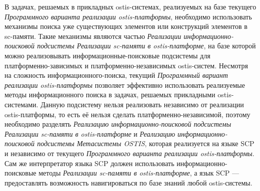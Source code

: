 \bigskip

В задачах, решаемых в прикладных ostis-системах, реализуемых на базе текущего \textit{Программного варианта реализации ostis-платформы}, необходимо использовать механизмы поиска уже существующих элементов или конструкций элементов в sc-памяти. Такие механизмы являются частью \textit{Реализации информационно-поисковой подсистемы Реализации sc-памяти в ostis-платформе}, на базе которой можно реализовывать информационные-поисковые подсистемы для платформенно-зависимых и платформенно-независимых ostis-систем. Несмотря на сложность информационного-поиска, текущий \textit{Программный вариант реализации ostis-платформы} позволяет эффективно использовать реализуемые методы информационного поиска в задачах, решаемых прикладными ostis-системами. Данную подсистему нельзя реализовать независимо от реализации ostis-платформы, то есть её нельзя сделать платформенно-независимой, поэтому необходимо разделять \textit{Реализацию информационно-поисковой подсистемы Реализации sc-памяти в ostis-платформе} и \textit{Реализацию информационно-поисковой подсистемы Метасистемы OSTIS}, которая реализуется на языке SCP и независимо от текущего \textit{Программного варианта реализации ostis-платформы}. Сам же интерпретатор языка SCP должен использовать информационно-поисковые методы \textit{Реализации sc-памяти в ostis-платформе}, а язык SCP --- предоставлять возможность навигироваться по базе знаний любой ostis-системы.

